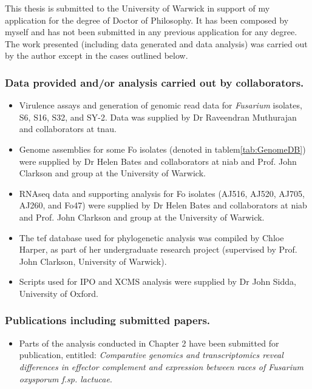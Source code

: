 This thesis is submitted to the University of Warwick in support of my application for the degree of Doctor of Philosophy. It has been composed by myself and has not been submitted in any previous application for any degree. The work presented (including data generated and data analysis) was carried out by the author except in the cases outlined below. 
\noindent
\subsubsection{Data provided and/or analysis carried out by collaborators.}
\begin{itemize}
    \item Virulence assays and generation of genomic read data for \textit{Fusarium} isolates, S6, S16, S32, and SY-2. Data was supplied by Dr Raveendran Muthurajan and collaborators at \acl{tnau}. 
    \item Genome assemblies for some \acl{Fo} isolates (denoted in tablem\ref{tab:GenomeDB}) were supplied by Dr Helen Bates and collaborators at \acl{niab} and Prof. John Clarkson and group at the University of Warwick. 
    \item RNAseq data and supporting analysis for \acl{Fo} isolates (AJ516, AJ520, AJ705, AJ260, and Fo47) were supplied by Dr Helen Bates and collaborators at \acl{niab} and Prof. John Clarkson and group at the University of Warwick. 
    \item The \acl{tef} database used for phylogenetic analysis was compiled by Chloe Harper, as part of her undergraduate research project (supervised by Prof. John Clarkson, University of Warwick).
    \item Scripts used for IPO and XCMS analysis were supplied by Dr John Sidda, University of Oxford.
\end{itemize} 

\subsubsection{Publications including submitted papers.}
\begin{itemize}
    \item Parts of the analysis conducted in Chapter 2 have been submitted for publication, entitled: \textit{Comparative genomics and transcriptomics reveal differences in effector complement and expression between races of Fusarium oxysporum f.sp. lactucae}. 
\end{itemize}
